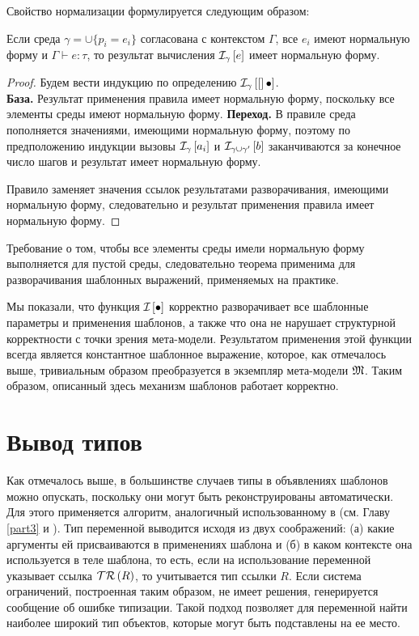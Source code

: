 \newcommand{\h}[1]{h\left(#1\right)}
Свойство нормализации формулируется следующим образом:

\begin{Th}[О нормализации]\label{ThNorm}
Если среда $\gamma = \cup \{p_i = e_i\}$ согласована с контекстом $\Gamma$, все $e_i$ имеют нормальную форму и $\Gamma \vdash e : \tau$, то результат вычисления $\mathcal{I}_{\gamma} \left[ e \right]$ имеет нормальную форму.
\end{Th}
\begin{proof} 
Будем вести индукцию по определению $\mathcal{I}_{\gamma} \left[ [ \right]\bullet]$.\\
\textbf{База.} Результат применения правила  имеет нормальную форму, поскольку все элементы среды имеют нормальную форму.
\textbf{Переход.} В правиле  среда пополняется значениями, имеющими нормальную форму, поэтому по предположению индукции вызовы $\mathcal{I}_{\gamma} \left[ a_i \right]$ и $\mathcal{I}_{\gamma \cup \gamma'} \left[ b \right]$ заканчиваются за конечное число шагов и результат имеет нормальную форму.

Правило  заменяет значения ссылок результатами разворачивания, имеющими нормальную форму, следовательно и результат применения правила имеет нормальную форму.
\end{proof}

Требование о том, чтобы все элементы среды имели нормальную форму выполняется для пустой среды, следовательно теорема применима для разворачивания шаблонных выражений, применяемых на практике.

Мы показали, что функция $\mathcal{I}_{} \left[ \bullet \right]$ корректно разворачивает все шаблонные параметры и применения шаблонов, а также что она не нарушает структурной корректности с точки зрения мета-модели. Результатом применения этой функции всегда является константное шаблонное выражение, которое, как отмечалось выше, тривиальным образом преобразуется в экземпляр мета-модели $\mathfrak{M}$. Таким образом, описанный здесь механизм шаблонов работает корректно.

\section{Вывод типов}

Как отмечалось выше, в большинстве случаев типы в объявлениях шаблонов можно опускать, поскольку они могут быть реконструированы автоматически. Для этого применяется алгоритм, аналогичный использованному в \ATF{} (см. Главу \ref{part3} и \cite{Pierce}). Тип переменной выводится исходя из двух соображений: (а) какие аргументы ей присваиваются в применениях шаблона и (б) в каком контексте она используется в теле шаблона, то есть, если на использование переменной указывает ссылка $\mathcal{TR}\left(R\right)$, то учитывается тип ссылки $R$. Если система ограничений, построенная таким образом, не имеет решения, генерируется сообщение об ошибке типизации. Такой подход позволяет для переменной найти наиболее широкий тип объектов, которые могут быть подставлены на ее место.

